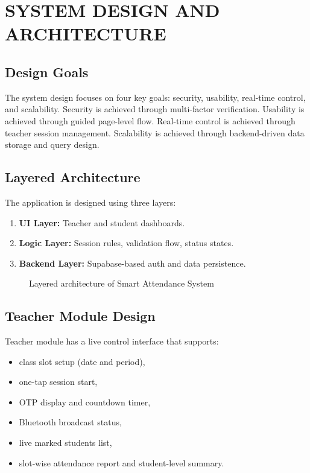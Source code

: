\chapter{SYSTEM DESIGN AND ARCHITECTURE} \label{c4}
\section{Design Goals}
The system design focuses on four key goals: security, usability, real-time control, and scalability. Security is achieved through multi-factor verification. Usability is achieved through guided page-level flow. Real-time control is achieved through teacher session management. Scalability is achieved through backend-driven data storage and query design.

\section{Layered Architecture}
The application is designed using three layers:
\begin{enumerate}
\item \textbf{UI Layer:} Teacher and student dashboards.
\item \textbf{Logic Layer:} Session rules, validation flow, status states.
\item \textbf{Backend Layer:} Supabase-based auth and data persistence.
\end{enumerate}

\begin{figure}[H]
\centering
{}
\caption{Layered architecture of Smart Attendance System}
\label{c4:fig1}
\end{figure}

\section{Teacher Module Design}
Teacher module has a live control interface that supports:
\begin{itemize}
\item class slot setup (date and period),
\item one-tap session start,
\item OTP display and countdown timer,
\item Bluetooth broadcast status,
\item live marked students list,
\item slot-wise attendance report and student-level summary.
\end{itemize}

